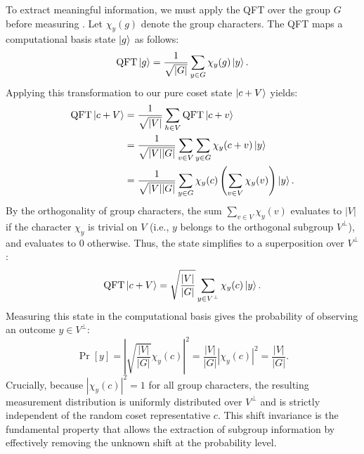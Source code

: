 To extract meaningful information, we must apply the QFT over the group $G$ before measuring \cite{Kitaev1995,Jozsa2001}. Let $\chi_y(g)$ denote the group characters. The QFT maps a computational basis state $\ket{g}$ as follows:
\begin{equation}
    \text{QFT} \ket{g} = \frac{1}{\sqrt{|G|}} \sum_{y \in G} \chi_y(g) \ket{y}.
\end{equation}
Applying this transformation to our pure coset state $\ket{c+V}$ yields:
\begin{align}
    \text{QFT} \ket{c+V} &= \frac{1}{\sqrt{|V|}} \sum_{h \in V} \text{QFT} \ket{c+v} \nonumber \\
    &= \frac{1}{\sqrt{|V||G|}} \sum_{v \in V} \sum_{y \in G} \chi_y(c+v) \ket{y} \nonumber \\
    &= \frac{1}{\sqrt{|V||G|}} \sum_{y \in G} \chi_y(c) \left( \sum_{v \in V} \chi_y(v) \right) \ket{y}.
\end{align}
By the orthogonality of group characters, the sum $\sum_{v \in V} \chi_y(v)$ evaluates to $|V|$ if the character $\chi_y$ is trivial on $V$ (i.e., $y$ belongs to the orthogonal subgroup $V^\perp$), and evaluates to $0$ otherwise. Thus, the state simplifies to a superposition over $V^\perp$:
\begin{equation}
    \text{QFT} \ket{c+V} = \sqrt{\frac{|V|}{|G|}} \sum_{y \in V^\perp} \chi_y(c) \ket{y}.
\end{equation}
Measuring this state in the computational basis gives the probability of observing an outcome $y \in V^\perp$:
\begin{equation}
    \Pr[y] = \left| \sqrt{\frac{|V|}{|G|}} \chi_y(c) \right|^2 = \frac{|V|}{|G|} |\chi_y(c)|^2 = \frac{|V|}{|G|}.
\end{equation}
Crucially, because $|\chi_y(c)|^2 = 1$ for all group characters, the resulting measurement distribution is uniformly distributed over $V^\perp$ and is strictly independent of the random coset representative $c$. This shift invariance is the fundamental property that allows the extraction of subgroup information by effectively removing the unknown shift at the probability level.

